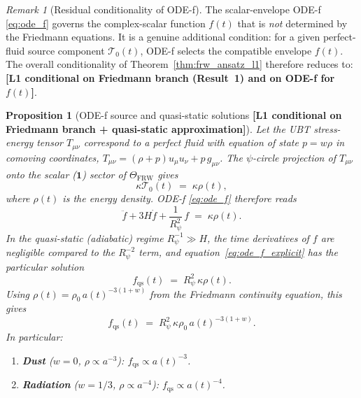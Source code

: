 \documentclass[12pt,a4paper]{article}
\newtheorem{proposition}[theorem]{Proposition}
\theoremstyle{definition}
\theoremstyle{remark}
\newtheorem{remark}[theorem]{Remark}
\begin{document}
\begin{remark}[Residual conditionality of ODE-f]
\label{rem:ode_f_residual}
The scalar-envelope ODE-f \eqref{eq:ode_f} governs the complex-scalar function
$f(t)$ that is \emph{not} determined by the Friedmann equations.  It is a
genuine additional condition: for a given perfect-fluid source component
$\mathcal{T}_0(t)$, ODE-f selects the compatible envelope $f(t)$.  The overall
conditionality of Theorem~\ref{thm:frw_ansatz_l1} therefore reduces to:
\textbf{[L1 conditional on Friedmann branch (Result~1) and on ODE-f for $f(t)$]}.
\end{remark}

\begin{proposition}[ODE-f source and quasi-static solutions
                   \textbf{[L1 conditional on Friedmann branch + quasi-static approximation]}]
\label{prop:ode_f_solutions}
Let the UBT stress-energy tensor $T_{\mu\nu}$ correspond to a perfect fluid
with equation of state $p = w\rho$ in comoving coordinates,
$T_{\mu\nu} = (\rho+p)u_\mu u_\nu + p\,g_{\mu\nu}$.
The $\psi$-circle projection of $T_{\mu\nu}$ onto the scalar ($\mathbf{1}$) sector
of $\Theta_{\mathrm{FRW}}$ gives
\begin{equation}
  \kappa\mathcal{T}_0(t) \;=\; \kappa\rho(t),
  \label{eq:T0_identification}
\end{equation}
where $\rho(t)$ is the energy density.
ODE-f \eqref{eq:ode_f} therefore reads
\begin{equation}
  \label{eq:ode_f_explicit}
  \ddot{f} + 3H\dot{f} + \frac{1}{R_\psi^2}\,f \;=\; \kappa\rho(t).
\end{equation}
In the quasi-static (adiabatic) regime $R_\psi^{-1} \gg H$, the time derivatives
of $f$ are negligible compared to the $R_\psi^{-2}$ term, and
equation~\eqref{eq:ode_f_explicit} has the particular solution
\begin{equation}
  \label{eq:f_particular}
  f_{\mathrm{qs}}(t) \;=\; R_\psi^2\,\kappa\rho(t).
\end{equation}
Using $\rho(t) = \rho_0\,a(t)^{-3(1+w)}$ from the Friedmann continuity equation,
this gives
\begin{equation}
  \label{eq:f_power_law}
  f_{\mathrm{qs}}(t) \;=\; R_\psi^2\,\kappa\rho_0\,a(t)^{-3(1+w)}.
\end{equation}
In particular:
\begin{enumerate}
  \item \textbf{Dust} ($w=0$, $\rho \propto a^{-3}$):
        $f_{\mathrm{qs}} \propto a(t)^{-3}$.
  \item \textbf{Radiation} ($w=1/3$, $\rho \propto a^{-4}$):
        $f_{\mathrm{qs}} \propto a(t)^{-4}$.
\end{enumerate}
\end{proposition}
\end{document}
